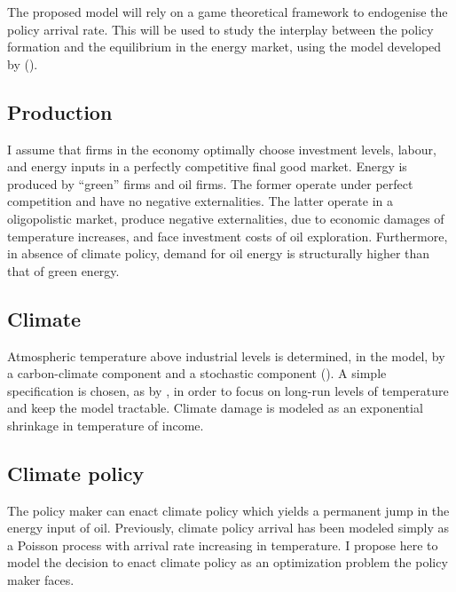 \documentclass[american]{scrartcl}
\newcommand{\citein}[1]{\citeauthor{#1} (\citeyear{#1})}
\begin{document}
The proposed model will rely on a game theoretical framework to endogenise the policy arrival rate. This will be used to study the interplay between the policy formation and the equilibrium in the energy market, using the model developed by \citein{Barnett2019}.

\subsection{Production}

I assume that firms in the economy optimally choose investment levels, labour, and energy inputs in a perfectly competitive final good market. Energy is produced by ``green'' firms and oil firms. The former operate under perfect competition and have no negative externalities. The latter operate in a oligopolistic market, produce negative externalities, due to economic damages of temperature increases, and face investment costs of oil exploration. Furthermore, in absence of climate policy, demand for oil energy is structurally higher than that of green energy.

\subsection{Climate}

Atmospheric temperature above industrial levels is determined, in the model, by a carbon-climate component and a stochastic component (\cite{MacDougall2015}). A simple specification is chosen, as by , in order to focus on long-run levels of temperature and keep the model tractable. Climate damage is modeled as an exponential shrinkage in temperature of income.

\subsection{Climate policy}

The policy maker can enact climate policy which yields a permanent jump in the energy input of oil. Previously, climate policy arrival has been modeled simply as a Poisson process with arrival rate increasing in temperature. I propose here to model the decision to enact climate policy as an optimization problem the policy maker faces.
\end{document}
